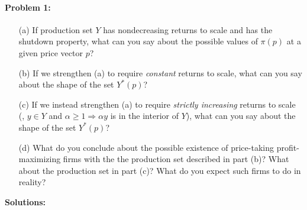 \documentclass[12pt]{article}
\begin{document}
\paragraph{Problem 1:} 

\begin{itemize}
    \item[(a)] If production set $Y$ has nondecreasing returns to scale and has the shutdown property, what can you say about the possible values of $\pi(p)$ at a given price vector $p$?

    \item[(b)] If we strengthen (a) to require \emph{constant} returns to scale, what can you say about the shape of the set $Y^*(p)$?

    \item[(c)] If we instead strengthen (a) to require \emph{strictly increasing} returns to scale (\ie, $y \in Y$ and $\alpha \ge 1 \Rightarrow \alpha y$ is in the interior of $Y$), what can you say about the shape of the set $Y^*(p)$?

    \item[(d)] What do you conclude about the possible existence of price-taking profit-maximizing firms with the the production set described in part (b)? What about the production set in part (c)? What do you expect such firms to do in reality?
\end{itemize}

\medskip

\textbf{Solutions:}
\end{document}
